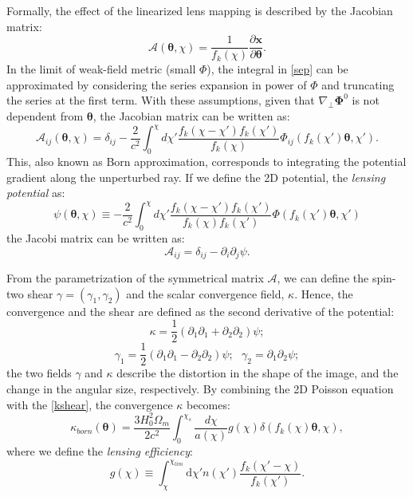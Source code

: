 \documentclass{aa}
\begin{document}
Formally, the effect of the linearized lens mapping is described by the Jacobian matrix:
\begin{equation}
\mathcal{A}(\boldsymbol{\theta},\chi)=
\frac{1}{f_{k}(\chi)}
\frac{\partial \textbf{x}}{\partial \boldsymbol{\theta}}.
\end{equation}
In the limit of weak-field metric (small $\Phi$), the integral in \autoref{sep} can be approximated by considering the series expansion in power of $\Phi$ and truncating the series at the first term.
With these assumptions, given that $\nabla_{\bot}\boldsymbol{\Phi}^0$ is not dependent from $\boldsymbol{\theta}$, the Jacobian matrix can be written as:
\begin{equation}
    \mathcal{A}_{ij}(\boldsymbol{\theta},\chi)
     =\delta_{ij}-\frac{2}{c^2}
    \int_0^{\chi} d\chi'
     \frac{f_k(\chi-\chi')f_k(\chi')}{f_k(\chi)}
     \Phi_{ij}(f_k(\chi')\boldsymbol{\theta},\chi').
\end{equation}
This, also known as Born approximation, corresponds to integrating the potential gradient along the unperturbed ray.
If we define the 2D potential, the \textit{lensing potential} as:
\begin{equation}
    \psi(\boldsymbol{\theta},\chi) \equiv
 -\frac{2}{c^2}
 \int_0^{\chi} d\chi'
   \frac{f_k(\chi-\chi')f_k(\chi')}{f_k(\chi)f_k(\chi')}
  \Phi(f_k(\chi')\boldsymbol{\theta},\chi')
\end{equation}
 the Jacobi matrix can be written as:
\begin{equation}
    \mathcal{A}_{ij}=\delta_{ij}-\partial_i \partial_j\psi.
\end{equation}

From the parametrization of the symmetrical matrix $\mathcal{A}$, we can define the spin-two shear $\gamma=(\gamma_1,\gamma_2)$ and the scalar convergence field, $\kappa$. 
Hence, the convergence and the shear are defined as the second derivative of the potential:
\begin{equation}\label{kshear}
    \kappa=\frac{1}{2}(\partial_1\partial_1+\partial_2\partial_2)\psi;  
\end{equation}
\begin{equation}
 \gamma_1=\frac{1}{2}(\partial_1\partial_1-\partial_2\partial_2)\psi; \  \  \
 \gamma_2=\partial_1\partial_2\psi;   
\end{equation}
the two fields $\gamma$ and $\kappa$ describe the distortion in the shape of the image, and the change in the angular size, respectively.
By combining the 2D Poisson equation with the \autoref{kshear}, the convergence $\kappa$ becomes:
\begin{equation}\label{born_approx}
    \kappa_{born}(\boldsymbol{\theta})= \frac{3H_0^2 \Omega_m}{2c^2}
    \int_0^{\chi_s} 
    \frac{d\chi}{a(\chi)}
    g(\chi)
    \delta(f_k(\chi)\boldsymbol{\theta},\chi),
\end{equation}
where we define the \textit{lensing efficiency}:
\begin{equation}
   g(\chi) \equiv
  \int_{\chi}^{\chi_{lim}} \text{d}\chi'
   n(\chi')
    \frac{f_k(\chi'-\chi)}{f_k(\chi')}.
\end{equation}
\end{document}
